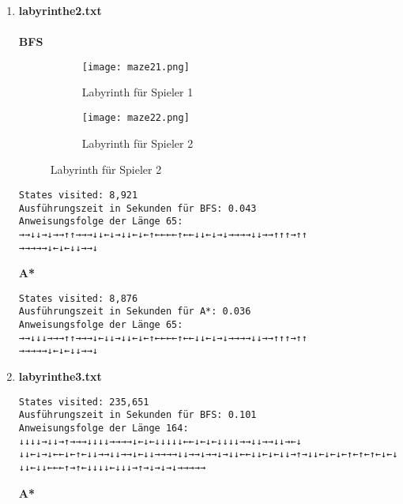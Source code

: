 \documentclass[a4paper,10pt,ngerman]{scrartcl}
\begin{document}
\begin{enumerate}
\begin{figure}[H]
\begin{subfigure}{0.45\textwidth}
        \centering
        \texttt{[image: maze12.png]}
        \caption{Labyrinth für Spieler 2}
    \end{subfigure}
\end{figure}
\begin{verbatim}
States visited: 342
Ausführungszeit in Sekunden für BFS: 0.031
Anweisungsfolge der Länge 31: →→→→↓↓←↑←↓←↑←↓↓→↑→↓→↑↑←←↑→→→↓↓↓
\end{verbatim}
\textbf{A*}
\begin{verbatim}
States visited: 320
Ausführungszeit in Sekunden für A*: 0.016
Anweisungsfolge der Länge 31: →→→→↓↓←↑←↓←↑←↓↓→↑→↓→↑↑←←↑→→→↓↓↓
\end{verbatim}
\newpage
  \item \textbf{labyrinthe2.txt}\\
\\\textbf{BFS}
\begin{figure}[H]
    \centering
    \begin{subfigure}{0.45\textwidth}
        \centering
        \texttt{[image: maze21.png]} 
        \caption{Labyrinth für Spieler 1}
    \end{subfigure}
    \hfill
    \begin{subfigure}{0.45\textwidth}
        \centering
        \texttt{[image: maze22.png]}
        \caption{Labyrinth für Spieler 2}
    \end{subfigure}
\end{figure}
\begin{verbatim}
States visited: 8,921
Ausführungszeit in Sekunden für BFS: 0.043
Anweisungsfolge der Länge 65: →→↓↓→↓→→↑↑→→→↓↓←↓→↓↓←↓←↑←←←←↑←←↓↓←↓→↓→→→→↓↓→→↑↑↑→↑↑
→→→→→↓←↓←↓↓→→↓
\end{verbatim}
\textbf{A*}
\begin{verbatim}
States visited: 8,876
Ausführungszeit in Sekunden für A*: 0.036
Anweisungsfolge der Länge 65: →→↓↓↓→→→↑↑→→→↓←↓↓→↓↓←↓←↑←←←←↑←←↓↓←↓→↓→→→→↓↓→→↑↑↑→↑↑
→→→→→↓←↓←↓↓→→↓
\end{verbatim}
  \item \textbf{labyrinthe3.txt}\\
\begin{verbatim}
States visited: 235,651
Ausführungszeit in Sekunden für BFS: 0.101
Anweisungsfolge der Länge 164: ↓↓↓↓→↓↓→↑→→→↓↓↓↓→→→→↓←↓←↓↓↓↓↓←←↓←↓←↓↓↓↓→→↓↓→→↓↓→←↓
↓↓←↓→↓←←↓←↑←↓↓→→↓↓→→↓←↓↓→→→→↓↓→→↓→→↓→↓↓←←↓↓←↓←↓↓→↑→↓↓←↓←↓←↑←↑←↑←↓←↓→→↓↓↓→→↑→→↑→↑→
↓↓←↓↓←←←↑→↑←↓↓↓↓←↓↓↓→↑→↓→↓→↓→→→→→
\end{verbatim}
\textbf{A*}

\end{enumerate}
\end{document}
